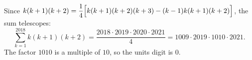 Since $k(k+1)(k+2)=\dfrac{1}{4}\Bigl[k(k+1)(k+2)(k+3)-(k-1)k(k+1)(k+2)\Bigr]$, the sum telescopes:
\[
\sum_{k=1}^{2018}k(k+1)(k+2)=\dfrac{2018\cdot2019\cdot2020\cdot2021}{4}=1009\cdot2019\cdot1010\cdot2021 .
\]
The factor $1010$ is a multiple of $10$, so the units digit is $\boxed{0}$.
